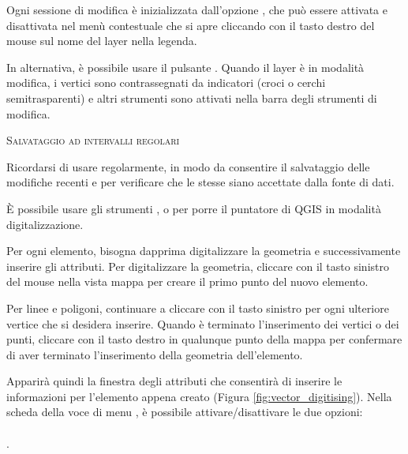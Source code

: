 Ogni sessione di modifica è inizializzata dall'opzione
, che può
essere attivata e disattivata nel menù contestuale che si apre 
cliccando con il tasto destro del mouse sul nome del layer nella legenda.  

In alternativa, è possibile usare il pulsante  
. 
Quando il layer è in modalità modifica, i vertici sono contrassegnati da indicatori (croci o cerchi
semitrasparenti) e altri strumenti sono attivati nella barra degli strumenti di modifica.

\begin{Tip}\caption{\textsc{Salvataggio ad intervalli regolari}}
Ricordarsi di usare  regolarmente, in modo da
consentire il salvataggio delle modifiche recenti e per verificare che le stesse siano accettate 
dalla fonte di dati.
\end{Tip}


È possibile usare gli strumenti ,
 o
 per porre il puntatore
di QGIS in modalità digitalizzazione.

Per ogni elemento, bisogna dapprima digitalizzare la geometria e
successivamente inserire gli attributi. Per digitalizzare la geometria, cliccare 
con il tasto sinistro del mouse nella vista mappa per creare il primo punto del nuovo elemento.

Per linee e poligoni, continuare a cliccare con il tasto sinistro per ogni
ulteriore vertice che si desidera inserire. Quando è terminato l'inserimento
dei vertici o dei punti, cliccare con il tasto destro in qualunque punto della
mappa per confermare di aver terminato l'inserimento della geometria dell'elemento.

Apparirà quindi la finestra degli attributi che consentirà di inserire le
informazioni per l'elemento appena creato (Figura \ref{fig:vector_digitising}).
Nella scheda  della voce di menu  \arrow {}, 
è possibile attivare/disattivare le due opzioni:
\\
 \\
.

